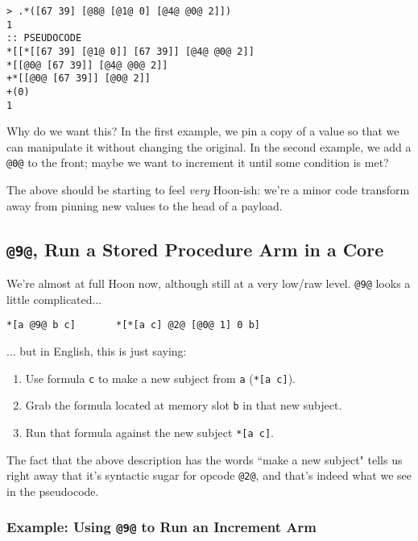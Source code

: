 \documentclass[twoside]{article}
\begin{document}
\begin{lstlisting}[style=listingcode]
> .*([67 39] [@8@ [@1@ 0] [@4@ @0@ 2]])
1
:: PSEUDOCODE
*[[*[[67 39] [@1@ 0]] [67 39]] [@4@ @0@ 2]]
*[[@0@ [67 39]] [@4@ @0@ 2]]
+*[[@0@ [67 39]] [@0@ 2]]
+(0)
1
\end{lstlisting}

Why do we want this? In the first example, we pin a copy of a value so that we can manipulate it without changing the original. In the second example, we add a \lstinline[style=inlinecode]{@0@} to the front; maybe we want to increment it until some condition is met?

The above should be starting to feel \emph{very} Hoon-ish: we're a minor code transform away from pinning new values to the head of a payload.

\subsection{\lstinline[style=inlinecode]{@9@}, Run a Stored Procedure Arm in a Core}

We're almost at full Hoon now, although still at a very low/raw level. \lstinline[style=inlinecode]{@9@} looks a little complicated...

\begin{lstlisting}[style=listingcode]
*[a @9@ b c]       *[*[a c] @2@ [@0@ 1] 0 b]
\end{lstlisting}

\noindent{}
... but in English, this is just saying:

\begin{enumerate}
  \item  Use formula \lstinline[style=inlinecode]{c} to make a new subject from \lstinline[style=inlinecode]{a} (\lstinline[style=inlinecode]{*[a c]}).
  \item  Grab the formula located at memory slot \lstinline[style=inlinecode]{b} in that new subject.
  \item  Run that formula against the new subject \lstinline[style=inlinecode]{*[a c]}.
\end{enumerate}

\noindent{}
The fact that the above description has the words ``make a new subject" tells us right away that it's syntactic sugar for opcode \lstinline[style=inlinecode]{@2@}, and that's indeed what we see in the pseudocode.

\subsubsection{Example: Using \lstinline[style=inlinecode]{@9@} to Run an Increment Arm}
\end{document}
